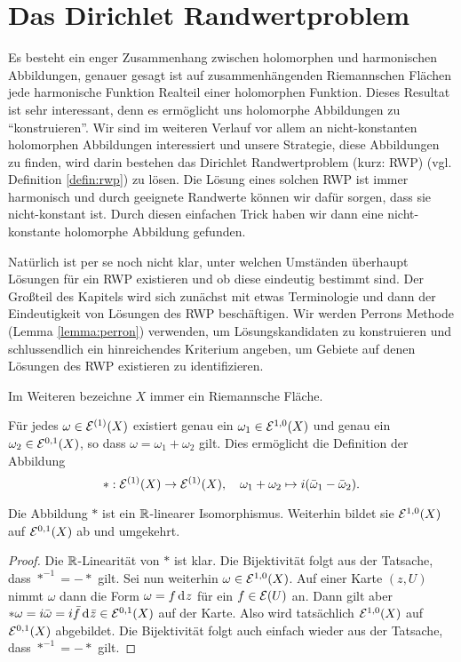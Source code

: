 
\section{Das Dirichlet Randwertproblem}
\label{sec:Dirichlet}

Es besteht ein enger Zusammenhang zwischen holomorphen und
harmonischen Abbildungen, genauer gesagt ist auf
zusammenhängenden Riemannschen Flächen jede harmonische Funktion
Realteil einer holomorphen Funktion. Dieses Resultat ist sehr
interessant, denn es ermöglicht uns holomorphe Abbildungen zu
"`konstruieren"'. Wir sind im weiteren Verlauf vor allem an
nicht-konstanten holomorphen Abbildungen interessiert und unsere
Strategie, diese Abbildungen zu finden, wird darin bestehen das
Dirichlet Randwertproblem (kurz: RWP) (vgl. Definition
\ref{defin:rwp}) zu lösen. Die Lösung eines solchen RWP ist immer
harmonisch und durch geeignete Randwerte können wir dafür sorgen, dass
sie nicht-konstant ist. Durch diesen einfachen Trick haben wir dann
eine nicht-konstante holomorphe Abbildung gefunden.

Natürlich ist per se noch nicht klar, unter welchen Umständen
überhaupt Lösungen für ein RWP existieren und ob diese eindeutig
bestimmt sind. Der Großteil des Kapitels wird sich zunächst mit etwas
Terminologie und dann der Eindeutigkeit von Lösungen des RWP
beschäftigen. Wir werden Perrons Methode (Lemma \ref{lemma:perron})
verwenden, um Lösungskandidaten zu konstruieren und schlussendlich ein
hinreichendes Kriterium angeben, um Gebiete auf denen Lösungen des RWP
existieren zu identifizieren.

Im Weiteren bezeichne $X$ immer ein Riemannsche Fläche.

\begin{defin}
  Für jedes $\omega \in \mathcal{E}^{(1)}(X)$ existiert genau ein $\omega_1
  \in \mathcal{E}^{1,0}(X)$ und genau ein $\omega_2 \in \mathcal{E}^{0,1}(X)$, so
  dass $\omega = \omega_1 + \omega_2$ gilt. Dies ermöglicht die
  Definition der Abbildung
  \[
  \ast : \mathcal{E}^{(1)}(X) \rightarrow \mathcal{E}^{(1)}(X), \quad \omega_1 + \omega_2
  \mapsto i(\bar \omega_1 - \bar \omega_2).
  \]
\end{defin}

\begin{prop}
  Die Abbildung $\ast$ ist ein $\mathbb{R}$-linearer Isomorphismus. Weiterhin
  bildet sie  $\mathcal{E}^{1,0}(X)$ auf $\mathcal{E}^{0,1}(X)$ ab und umgekehrt.
\end{prop}

\begin{proof}
  Die $\mathbb{R}$-Linearität von $\ast$ ist klar. Die Bijektivität folgt aus
  der Tatsache, dass $\ast^{-1} = - \ast$ gilt. Sei nun weiterhin
  $\omega \in \mathcal{E}^{1,0}(X)$. Auf einer Karte $(z,U)$ nimmt $\omega$
  dann die Form $\omega = f \d[z]$ für ein $f \in \mathcal{E}(U)$ an. Dann gilt
  aber $\ast \omega = i \bar \omega = i \bar f \d[\bar z] \in
  \diff^{0,1}(X)$ auf der Karte. Also wird tatsächlich
  $\mathcal{E}^{1,0}(X)$ auf $\mathcal{E}^{0,1}(X)$ abgebildet. Die Bijektivität
  folgt auch einfach wieder aus der Tatsache, dass $\ast^{-1} = -
  \ast$ gilt.
\end{proof}

